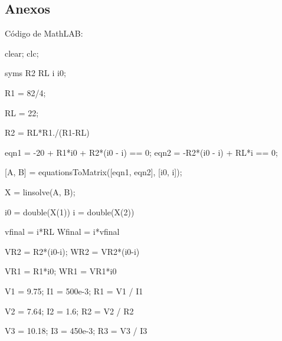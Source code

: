 \subsection{Anexos}
Código de MathLAB:

clear; clc;

syms R2 RL i i0;

R1 = 82/4;

RL = 22;

R2 = RL*R1./(R1-RL)

eqn1 = -20 + R1*i0 + R2*(i0 - i) == 0;
eqn2 = -R2*(i0 - i) + RL*i == 0;

[A, B] = equationsToMatrix([eqn1, eqn2], [i0, i]);

X = linsolve(A, B);

i0 = double(X(1))
i = double(X(2))

vfinal = i*RL
Wfinal = i*vfinal

VR2 = R2*(i0-i);
WR2 = VR2*(i0-i)

VR1 = R1*i0;
WR1 = VR1*i0

V1 = 9.75;
I1 = 500e-3;
R1 = V1 / I1

V2 = 7.64;
I2 = 1.6;
R2 = V2 / R2

V3 = 10.18;
I3 = 450e-3;
R3 = V3 / I3
